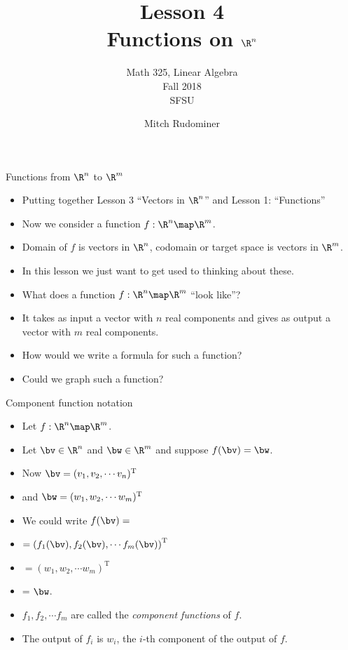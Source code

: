 \documentclass{beamer}
\title{Lesson 4 \\ Functions on $\R^n$}
\subtitle{Math 325, Linear Algebra \\ Fall 2018 \\ SFSU}
\author{Mitch Rudominer}
\date{}
\begin{document}
\begin{frame}
  \titlepage
\end{frame}


\beamerdefaultoverlayspecification{<+->}

\begin{frame}{Functions from $\R^n$ to $\R^m$}

\begin{itemize}
\item Putting together Lesson 3 ``Vectors in $\R^n$'' and Lesson 1: ``Functions''
\item Now we consider a function $f:\R^n \map \R^m$.
\item Domain of $f$ is vectors in $\R^n$, codomain or target space is vectors
in $\R^m$.
\item In this lesson we just want to get used to thinking about these.
\item What does a function $f:\R^n \map \R^m$ ``look like''?
\item It takes as input a vector with $n$ real components and gives as output
a vector with $m$ real components.
\item How would we write a formula for such a function?
\item Could we graph such a function?
\end{itemize}

\end{frame}

\begin{frame}{Component function notation}

\begin{itemize}
\item Let $f:\R^n \map \R^m$.
\item Let $\bv \in \R^n$ and $\bw \in \R^m$ and suppose $f(\bv) = \bw$.
\item Now $\bv = (v_1, v_2, \cdots v_n)^{\text{T}}$
\item and $\bw = (w_1, w_2, \cdots w_m)^{\text{T}}$
\item We could write $f(\bv) =$
\item $ = \left(f_1(\bv), f_2(\bv), \cdots f_m(\bv)\right)^{\text{T}}$
\item $= (w_1, w_2, \cdots w_m)^{\text{T}}$
\item = $\bw$.
\item $f_1,f_2,\cdots f_m$ are called the \emph{component functions} of $f$.
\item The output of $f_i$ is $w_i$, the $i$-th component of the output of $f$.
\end{itemize}

\end{frame}
\end{document}
